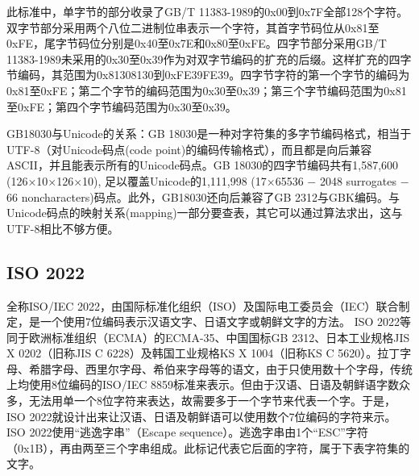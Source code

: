 此标准中，单字节的部分收录了GB/T 11383-1989的0x00到0x7F全部128个字符。双字节部分采用两个八位二进制位串表示一个字符，其首字节码位从0x81至0xFE，尾字节码位分别是0x40至0x7E和0x80至0xFE。四字节部分采用GB/T 11383-1989未采用的0x30至0x39作为对双字节编码的扩充的后缀。这样扩充的四字节编码，其范围为0x81308130到0xFE39FE39。四字节字符的第一个字节的编码为0x81至0xFE；第二个字节的编码范围为0x30至0x39；第三个字节编码范围为0x81至0xFE；第四个字节编码范围为0x30至0x39。

GB18030与Unicode的关系：GB 18030是一种对字符集的多字节编码格式，相当于UTF-8（对Unicode码点(code point)的编码传输格式），而且都是向后兼容ASCII，并且能表示所有的Unicode码点。GB 18030的四字节编码共有1,587,600 (126×10×126×10), 足以覆盖Unicode的1,111,998 (17×65536 − 2048 surrogates − 66 noncharacters)码点。此外，GB18030还向后兼容了GB 2312与GBK编码。与Unicode码点的映射关系(mapping)一部分要查表，其它可以通过算法求出，这与UTF-8相比不够方便。


\subsection{ISO 2022}

全称ISO/IEC 2022，由国际标准化组织（ISO）及国际电工委员会（IEC）联合制定，是一个使用7位编码表示汉语文字、日语文字或朝鲜文字的方法。
ISO 2022等同于欧洲标准组织（ECMA）的ECMA-35、中国国标GB 2312、日本工业规格JIS X 0202（旧称JIS C 6228）及韩国工业规格KS X 1004（旧称KS C 5620）。拉丁字母、希腊字母、西里尔字母、希伯来字母等的语文，由于只使用数十个字母，传统上均使用8位编码的ISO/IEC 8859标准来表示。但由于汉语、日语及朝鲜语字数众多，无法用单一个8位字符来表达，故需要多于一个字节来代表一个字。于是，ISO 2022就设计出来让汉语、日语及朝鲜语可以使用数个7位编码的字符来示。ISO 2022使用“逃逸字串”（Escape sequence）。逃逸字串由1个“ESC”字符（0x1B），再由两至三个字串组成。此标记代表它后面的字符，属于下表字符集的文字。





























